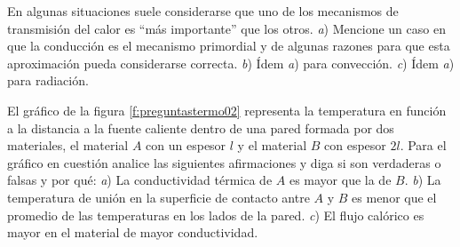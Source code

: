 %
\begin{Exercise}
  En algunas situaciones suele considerarse que uno de los mecanismos de transmisión del calor es ``más importante'' que los otros. \textit{a}) Mencione un caso en que la conducción es el mecanismo primordial y de algunas razones para que esta aproximación pueda considerarse correcta. \textit{b}) Ídem \textit{a}) para convección. \textit{c}) Ídem \textit{a}) para radiación.
\end{Exercise}
%
\begin{Exercise}\label{p:preguntastermo02}
  {}{}
  El gráfico de la figura \ref{f:preguntastermo02} representa la temperatura en función a la distancia a la fuente caliente dentro de una pared formada por dos materiales, el material $A$ con un espesor $l$ y el material $B$ con espesor $2l$. Para el gráfico en cuestión analice las siguientes afirmaciones y diga si son verdaderas o falsas y por qué: \textit{a}) La conductividad térmica de $A$ es mayor que la de $B$. \textit{b}) La temperatura de unión en la superficie de contacto antre $A$ y $B$ es menor que el promedio de las temperaturas en los lados de la pared. \textit{c}) El flujo calórico es mayor en el material de mayor conductividad.
\end{Exercise}
%
